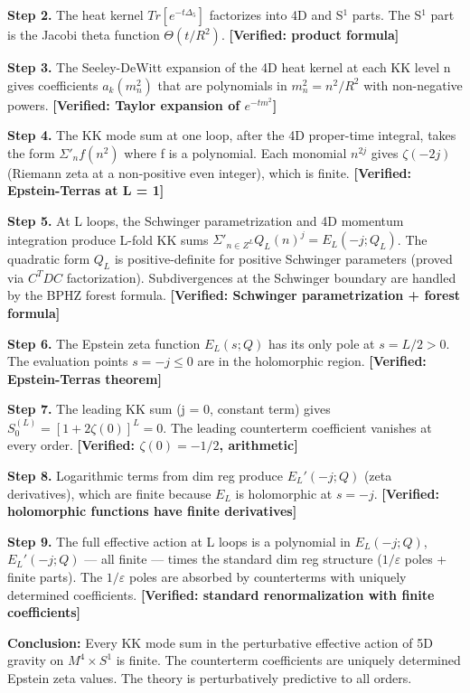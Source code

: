 \documentclass[aps,prd,preprint,superscriptaddress,longbibliography,floatfix]{revtex4-2}
\theoremstyle{remark}
\begin{document}
\textbf{Step 2.} The heat kernel $Tr[e^{-t\Delta_{5}}]$ factorizes into 4D and S$^{1}$ parts. The S$^{1}$ part is the Jacobi theta function $\Theta(t/R^{2})$. \textbf{[Verified: product formula]}

\textbf{Step 3.} The Seeley-DeWitt expansion of the 4D heat kernel at each KK level n gives coefficients $a_k(m_n^{2})$ that are polynomials in $m_n^{2} = n^{2}/R^{2}$ with non-negative powers. \textbf{[Verified: Taylor expansion of $e^{-tm^{2}}$]}

\textbf{Step 4.} The KK mode sum at one loop, after the 4D proper-time integral, takes the form $\Sigma'_n f(n^{2})$ where f is a polynomial. Each monomial $n^{2j}$ gives $\zeta(-2j)$ (Riemann zeta at a non-positive even integer), which is finite. \textbf{[Verified: Epstein-Terras at L = 1]}

\textbf{Step 5.} At L loops, the Schwinger parametrization and 4D momentum integration produce L-fold KK sums $\Sigma'_{n \in Z^L} Q_L(n)^j = E_L(-j; Q_L)$. The quadratic form $Q_L$ is positive-definite for positive Schwinger parameters (proved via $C^{T}DC$ factorization). Subdivergences at the Schwinger boundary are handled by the BPHZ forest formula. \textbf{[Verified: Schwinger parametrization + forest formula]}

\textbf{Step 6.} The Epstein zeta function $E_L(s; Q)$ has its only pole at $s = L/2 > 0$. The evaluation points $s = -j \leq 0$ are in the holomorphic region. \textbf{[Verified: Epstein-Terras theorem]}

\textbf{Step 7.} The leading KK sum (j = 0, constant term) gives $S_{0}^{(L)} = [1 + 2\zeta(0)]^L = 0$. The leading counterterm coefficient vanishes at every order. \textbf{[Verified: $\zeta(0) = -1/2$, arithmetic]}

\textbf{Step 8.} Logarithmic terms from dim reg produce $E_L'(-j; Q)$ (zeta derivatives), which are finite because $E_L$ is holomorphic at $s = -j$. \textbf{[Verified: holomorphic functions have finite derivatives]}

\textbf{Step 9.} The full effective action at L loops is a polynomial in {$E_L(-j; Q)$, $E_L'(-j; Q)$} --- all finite --- times the standard dim reg structure ($1/\varepsilon$ poles + finite parts). The $1/\varepsilon$ poles are absorbed by counterterms with uniquely determined coefficients. \textbf{[Verified: standard renormalization with finite coefficients]}

\textbf{Conclusion:} Every KK mode sum in the perturbative effective action of 5D gravity on $M^{4} \times S^{1}$ is finite. The counterterm coefficients are uniquely determined Epstein zeta values. The theory is perturbatively predictive to all orders. 
\end{document}
